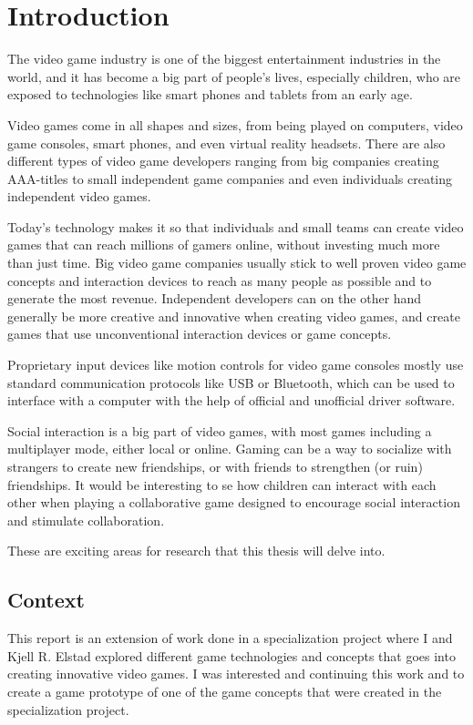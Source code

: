 \chapter{Introduction}
The video game industry is one of the biggest entertainment industries in the world, and it has become a big part of people's lives, especially children, who are exposed to technologies like smart phones and tablets from an early age. 

Video games come in all shapes and sizes, from being played on computers, video game consoles, smart phones, and even virtual reality headsets. There are also different types of video game developers ranging from big companies creating AAA-titles to small independent game companies and even individuals creating independent video games. 

Today's technology makes it so that individuals and small teams can create video games that can reach millions of gamers online, without investing much more than just time. Big video game companies usually stick to well proven video game concepts and interaction devices to reach as many people as possible and to generate the most revenue. Independent developers can on the other hand generally be more creative and innovative when creating video games, and create games that use unconventional interaction devices or game concepts.

Proprietary input devices like motion controls for video game consoles mostly use standard communication protocols like USB or Bluetooth, which can be used to interface with a computer with the help of official and unofficial driver software. 

Social interaction is a big part of video games, with most games including a multiplayer mode, either local or online. Gaming can be a way to socialize with strangers to create new friendships, or with friends to strengthen (or ruin) friendships. It would be interesting to se how children can interact with each other when playing a collaborative game designed to encourage social interaction and stimulate collaboration.

These are exciting areas for research that this thesis will delve into.

\section{Context}
This report is an extension of work done in a specialization project where I and Kjell R. Elstad explored different game technologies and concepts that goes into creating innovative video games. I was interested and continuing this work and to create a game prototype of one of the game concepts that were created in the specialization project.


